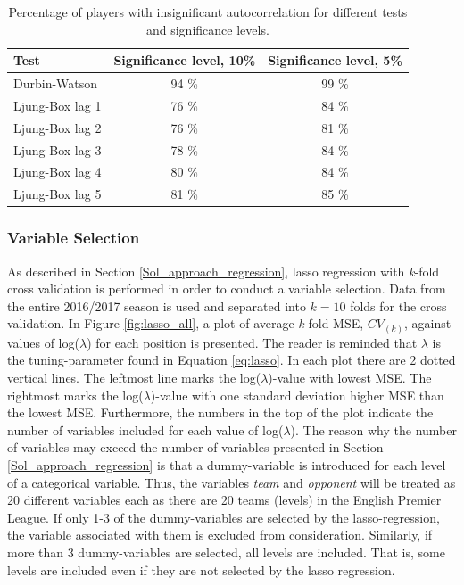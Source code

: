 \newpar

\begin{table}[H]
\centering
\begin{tabular}{|l|c|c|}
\hline
Test            & Significance level, 10\% & Significance level, 5\% \\
\hline
Durbin-Watson \Tstrut   & 94 \% & 99 \%                                            \\
Ljung-Box lag 1 & 76 \% & 84 \%                                            \\
Ljung-Box lag 2 & 76 \% & 81 \%                                            \\
Ljung-Box lag 3 & 78 \% & 84 \%                                            \\
Ljung-Box lag 4 & 80 \% & 84 \%                                           \\
Ljung-Box lag 5 \Bstrut  & 81 \% & 85 \%                
\\
\hline
\end{tabular}
\caption{Percentage of players with insignificant autocorrelation for different tests and significance levels.}
\label{tab:auto_tests}
\end{table}

\subsubsection{Variable Selection}

As described in Section \ref{Sol_approach_regression}, lasso regression with \textit{k}-fold cross validation is performed in order to conduct a variable selection. Data from the entire 2016/2017 season is used and separated into $\textit{k}=10$ folds for the cross validation. In Figure \ref{fig:lasso_all}, a plot of average \textit{k}-fold MSE, $CV_{(k)}$, against values of log($\lambda$) for each position is presented. The reader is reminded that $\lambda$ is the tuning-parameter found in Equation \ref{eq:lasso}. In each plot there are 2 dotted vertical lines. The leftmost line marks the log($\lambda$)-value with lowest MSE. The rightmost marks the log($\lambda$)-value with one standard deviation higher MSE than the lowest MSE. Furthermore, the numbers in the top of the plot indicate the number of variables included for each value of log($\lambda$). The reason why the number of variables may exceed the number of variables presented in Section \ref{Sol_approach_regression} is that a dummy-variable is introduced for each level of a categorical variable. Thus, the variables \textit{team} and \textit{opponent} will be treated as 20 different variables each as there are 20 teams (levels) in the English Premier League. If only 1-3 of the dummy-variables are selected by the lasso-regression, the variable associated with them is excluded from consideration. Similarly, if more than 3 dummy-variables are selected, all levels are included. That is, some levels are included even if they are not selected by the lasso regression.

